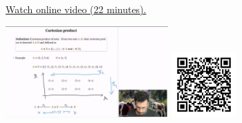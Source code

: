 
\begin{minipage}{10cm}
    \href{https://act4e-spring21.netlify.app/spring2021-products:products:cat-prod:example-prod.html}{Watch online video (22 minutes).}
        
    \href{https://act4e-spring21.netlify.app/spring2021-products:products:cat-prod:example-prod.html}{\includegraphics[height=3.5cm]{spring2021-products:products:cat-prod:example-prod/thumbnails.jpg}}
    \href{https://act4e-spring21.netlify.app/spring2021-products:products:cat-prod:example-prod.html}{\includegraphics[height=2.5cm]{spring2021-products:products:cat-prod:example-prod/qrcode.png}}
\end{minipage}
